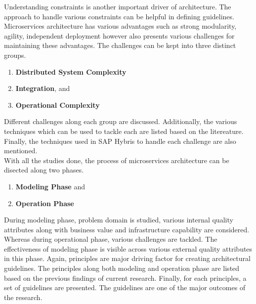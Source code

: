 Understanding constraints is another important driver of architecture. The approach to handle various constraints can be helpful in defining guidelines. Microservices architecture has various advantages such as strong modularity, agility, independent deployment however also presents various challenges for maintaining these advantages. The challenges can be kept into three distinct groups.
\begin{enumerate}
\item \textbf{Distributed System Complexity}
\item \textbf{Integration}, and
\item \textbf{Operational Complexity}
\end{enumerate}
Different challenges along each group are discussed. Additionally, the various techniques which can be used to tackle each  are listed based on the litereature. Finally, the techniques used in SAP Hybris to handle each challenge are also mentioned.\\
With all the studies done, the process of microservices architecture can be disected along two phases.
\begin{enumerate}
\item \textbf{Modeling Phase} and 
\item\textbf{Operation Phase}
\end{enumerate}
During modeling phase, problem domain is studied, various internal quality attributes along with business value and infrastructure capability are considered. Whereas during operational phase, various challenges are tackled. The effectiveness of modeling phase is visible across various external quality attributes in this phase. Again, principles are major driving factor for creating architectural guidelines. The principles along both modeling and operation phase are listed based on the previous findings of current research. Finally, for each principles, a set of guidelines are presented. The guidelines are one of the major outcomes of the research.
